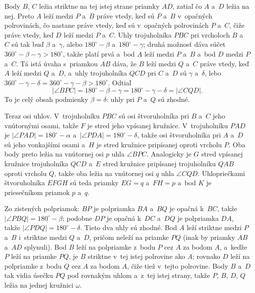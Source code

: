 {    Body $B$, $C$ ležia striktne na tej istej strane priamky $AD$, zatiaľ čo $A$ a~$D$ ležia na nej. Preto $A$ leží medzi $P$ a~$B$ práve vtedy, keď sú $P$ a~$B$ v~opačných polrovinách, čo nastane práve vtedy, keď sú v~opačných polrovinách $P$ a~$C$, čiže práve vtedy, keď $D$ leží medzi $P$ a~$C$. Uhly trojuholníka $PBC$ pri vrcholoch $B$ a~$C$ sú tak buď $\beta$ a~$\gamma$, alebo $180^\circ - \beta$ a~$180^\circ - \gamma$; druhá možnosť dáva súčet $360^\circ - \beta - \gamma > 180^\circ$, takže platí prvá a~bod $A$ leží medzi $P$ a~$B$ a~bod $D$ medzi $P$ a~$C$. Tá istá úvaha s~priamkou $AB$ dáva, že $B$ leží medzi $Q$ a~$C$ práve vtedy, keď $A$ leží medzi $Q$ a~$D$, a~uhly trojuholníka $QCD$ pri $C$ a~$D$ sú $\gamma$ a~$\delta$, lebo $360^\circ - \gamma - \delta = 360^\circ - \gamma - \beta > 180^\circ$. Odtiaľ
    $$
    |\angle BPC| = 180^\circ - \beta - \gamma = 180^\circ - \gamma - \delta = |\angle CQD|.
    $$
    To je celý obsah podmienky $\beta = \delta$: uhly pri $P$ a~$Q$ sú zhodné.

    Teraz osi uhlov. V~trojuholníku $PBC$ sú osi štvoruholníka pri $B$ a~$C$ jeho vnútornými osami, takže $F$ je stred jeho vpísanej kružnice. V~trojuholníku $PAD$ je $|\angle PAD| = 180^\circ - \alpha$ a~$|\angle PDA| = 180^\circ - \delta$, takže osi štvoruholníka pri $A$ a~$D$ sú jeho vonkajšími osami a~$H$ je stred kružnice pripísanej oproti vrcholu $P$. Oba body preto ležia na vnútornej osi $p$ uhla $\angle BPC$. Analogicky je $G$ stred vpísanej kružnice trojuholníka $QCD$ a~$E$ stred kružnice pripísanej trojuholníku $QAB$ oproti vrcholu $Q$, takže oba ležia na vnútornej osi $q$ uhla $\angle CQD$. Uhlopriečkami štvoruholníka $EFGH$ sú teda priamky $EG = q$ a~$FH = p$ a~bod $K$ je priesečníkom priamok $p$ a~$q$.

    Zo zistených polpriamok: $BP$ je polpriamka $BA$ a~$BQ$ je opačná k~$BC$, takže $|\angle PBQ| = 180^\circ - \beta$; podobne $DP$ je opačná k~$DC$ a~$DQ$ je polpriamka $DA$, takže $|\angle PDQ| = 180^\circ - \delta$. Tieto dva uhly sú zhodné. Bod $A$ leží striktne medzi $P$ a~$B$ i~striktne medzi $Q$ a~$D$, pričom neleží na priamke $PQ$ (inak by priamky $AB$ a~$AD$ splynuli). Bod $B$ leží na polpriamke z~bodu $P$ cez $A$ za bodom $A$, a~keďže $P$ leží na priamke $PQ$, je $B$ striktne v~tej istej polrovine ako $A$; rovnako $D$ leží na polpriamke z~bodu $Q$ cez $A$ za bodom $A$, čiže tiež v~tejto polrovine. Body $B$ a~$D$ tak vidia úsečku $PQ$ pod rovnakým uhlom a~z~tej istej strany, takže $P$, $B$, $D$, $Q$ ležia na jednej kružnici $\omega$.

}
